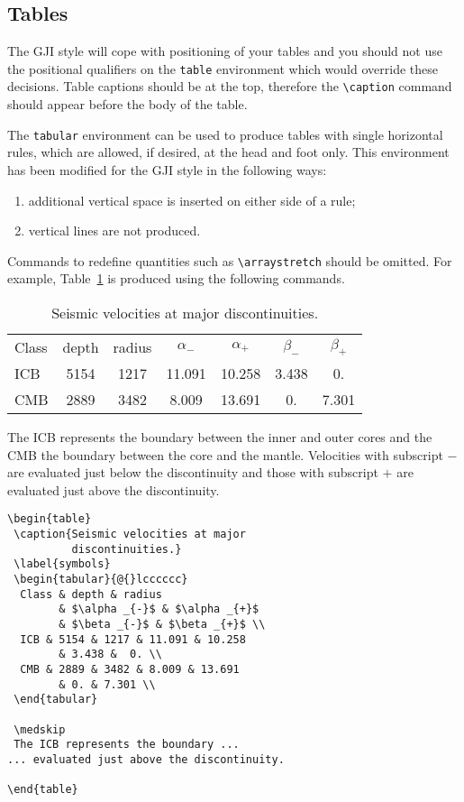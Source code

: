\subsection{Tables}

The GJI style will cope with positioning of your tables and you
should not use the positional qualifiers on the
\verb"table" environment which would override these decisions. Table
captions should be at the top, therefore the \verb"\caption" command
should appear before the body of the table.

The \verb"tabular" environment can be used to produce tables with
single horizontal rules, which are allowed, if desired, at the head and
foot only. This environment has been modified for the GJI style in the
following ways:
\begin{enumerate}
  \item additional vertical space is inserted on either side of a rule;
  \item vertical lines are not produced.
\end{enumerate}
Commands to redefine quantities such as \verb"\arraystretch" should be
omitted. For example, Table~\ref{symbols} is produced using the
following commands.
\begin{table}
 \caption{Seismic velocities at major discontinuities.}\label{symbols}
 \begin{tabular}{@{}lcccccc}
  Class & depth & radius
        & $\alpha _{-}$ & $\alpha _{+}$
        & $\beta _{-}$ & $\beta _{+}$ \\
  ICB & 5154 & 1217 & 11.091 & 10.258
        & 3.438 &  0. \\
  CMB & 2889 & 3482 & 8.009 & 13.691
        & 0. & 7.301 \\
 \end{tabular}

 \medskip
 The ICB represents the boundary between the inner and outer cores and
the CMB the boundary between the core and the mantle.  Velocities with
subscript $-$ are evaluated just below the discontinuity and
those with subscript $+$ are evaluated just above the discontinuity.
\end{table}
\begin{verbatim}
\begin{table}
 \caption{Seismic velocities at major
          discontinuities.}
 \label{symbols}
 \begin{tabular}{@{}lcccccc}
  Class & depth & radius
        & $\alpha _{-}$ & $\alpha _{+}$
        & $\beta _{-}$ & $\beta _{+}$ \\
  ICB & 5154 & 1217 & 11.091 & 10.258
        & 3.438 &  0. \\
  CMB & 2889 & 3482 & 8.009 & 13.691
        & 0. & 7.301 \\
 \end{tabular}

 \medskip
 The ICB represents the boundary ...
... evaluated just above the discontinuity.

\end{table}
\end{verbatim}

